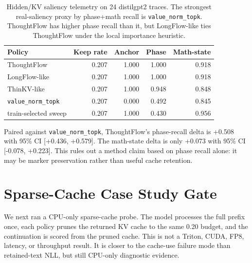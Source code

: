 \documentclass{article}
\begin{document}
\begin{table}[h]
\centering
\small
\begin{tabular}{lrrrr}
\toprule
Policy & Keep rate & Anchor & Phase & Math-state \\
\midrule
ThoughtFlow & 0.207 & 1.000 & 1.000 & 0.918 \\
LongFlow-like & 0.207 & 1.000 & 1.000 & 0.918 \\
ThinKV-like & 0.207 & 1.000 & 0.948 & 0.848 \\
\texttt{value\_norm\_topk} & 0.207 & 0.000 & 0.492 & 0.845 \\
train-selected sweep & 0.207 & 1.000 & 0.430 & 0.956 \\
\bottomrule
\end{tabular}
\caption{Hidden/KV saliency telemetry on 24 distilgpt2 traces. The strongest real-saliency proxy by phase+math recall is \texttt{value\_norm\_topk}. ThoughtFlow has higher phase recall than it, but LongFlow-like ties ThoughtFlow under the local importance heuristic.}
\end{table}

Paired against \texttt{value\_norm\_topk}, ThoughtFlow's phase-recall delta is +0.508 with 95\% CI [+0.436, +0.579]. The math-state delta is only +0.073 with 95\% CI [-0.078, +0.223]. This rules out a method claim based on phase recall alone: it may be marker preservation rather than useful cache retention.

\section{Sparse-Cache Case Study Gate}

We next ran a CPU-only sparse-cache probe. The model processes the full
prefix once, each policy prunes the returned KV cache to the same 0.20 budget,
and the continuation is scored from the pruned cache. This is not a Triton,
CUDA, FP8, latency, or throughput result. It is closer to the cache-use
failure mode than retained-text NLL, but still CPU-only diagnostic evidence.
\end{document}
